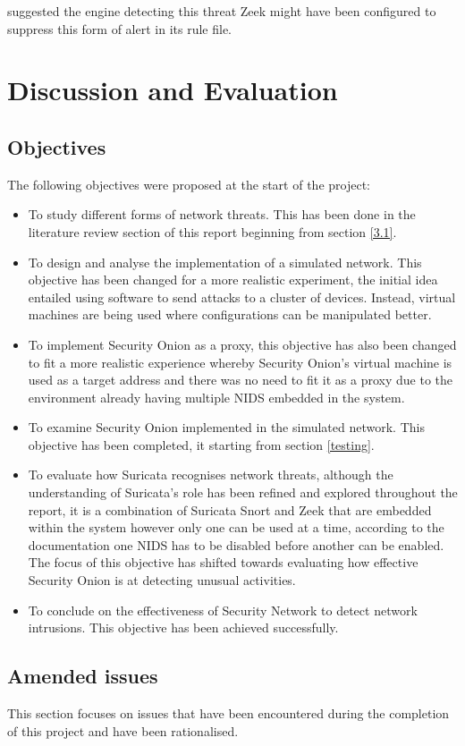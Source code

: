 \documentclass[12pt]{article}
\begin{document}
suggested the engine detecting this threat Zeek might have been configured to suppress this form of alert in its rule file.


\section{Discussion and Evaluation}
\subsection{Objectives}
The following objectives were proposed at the start of the project:
\begin{itemize}
\item To study different forms of network threats. This has been done in the literature review section of this report beginning from section \ref{3.1}.
\item To design and analyse the implementation of a simulated network. This objective has been changed for a more realistic experiment, the initial idea entailed using software to send attacks to a cluster of devices. Instead, virtual machines are being used where configurations can be manipulated better. 
\item To implement Security Onion as a proxy, this objective has also been changed to fit a more realistic experience whereby Security Onion's virtual machine is used as a target address and there was no need to fit it as a proxy due to the environment already having multiple NIDS embedded in the system.
\item To examine Security Onion implemented in the simulated network. This objective has been completed, it starting from section \ref{testing}.
\item To evaluate how Suricata recognises network threats, although the understanding of Suricata's role has been refined and explored throughout the report, it is a combination of Suricata Snort and Zeek that are embedded within the system however only one can be used at a time, according to the documentation one NIDS has to be disabled before another can be enabled. The focus of this objective has shifted towards evaluating how effective Security Onion is at detecting unusual activities.
\item To conclude on the effectiveness of Security Network to detect network intrusions. This objective has been achieved successfully.

\end{itemize}

\subsection{Amended issues}
This section focuses on issues that have been encountered during the completion of this project and have been rationalised.
\end{document}
